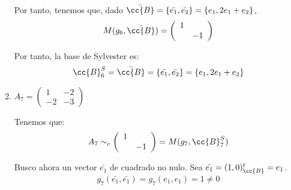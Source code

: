\begin{ejercicio}
\begin{enumerate}
        Por tanto, tenemos que, dado $\bar{\cc{B}} = \{\bar{e_1},\bar{e_2}\} = \{e_1, 2e_1+e_2\}$,
        \begin{equation*}
            M(g_6, \bar{\cc{B}}) = \left(\begin{array}{cc}
            1 &  \\
             & -1
        \end{array} \right)
        \end{equation*}

        Por tanto, la base de Sylvester es:
        \begin{equation*}
            \cc{B}_6^S = \bar{\cc{B}} = \left\{\bar{e_1},\bar{e_2}\right\} = \left\{e_1, 2e_1+e_2\right\}
        \end{equation*}

        \item $A_7=\left(\begin{array}{cc}
            1 & -2 \\
            -2 & -3
        \end{array} \right)$
        
        Tenemos que:
        \begin{equation*}
            A_7 \sim_c \left(\begin{array}{cc}
                1 &  \\
                & -1
            \end{array} \right) = M(g_7, \cc{B}_{7}^S)
        \end{equation*}
        
        Busco ahora un vector $\bar{e_1}$ de cuadrado no nulo. Sea $\bar{e_1} = (1,0)^t_{\cc{B}} = e_1$.
        \begin{equation*}
            g_7(\bar{e_1}, \bar{e_1}) =
            g_7(e_1, e_1) = 1 \neq 0
        \end{equation*}


\end{enumerate}
\end{ejercicio}
